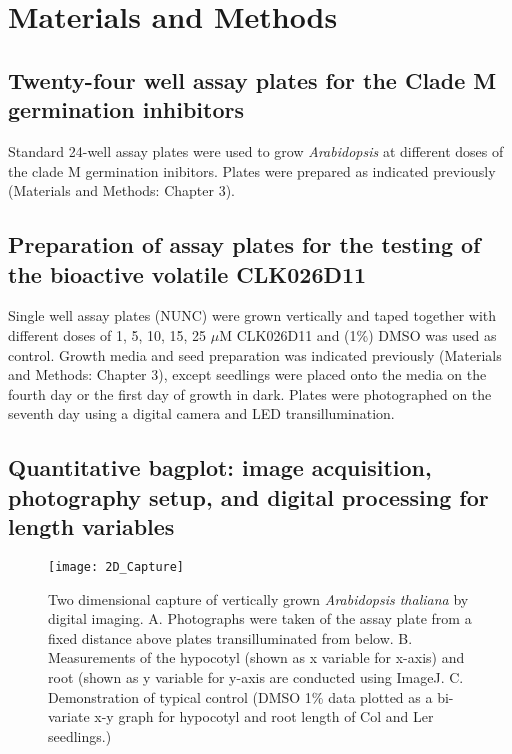 
\section{Materials and Methods}

\subsection{Twenty-four well assay plates for the Clade M germination inhibitors}

Standard 24-well assay plates were used to grow {\it Arabidopsis} at different doses of the clade M germination inibitors. Plates were prepared as indicated previously (Materials and Methods: Chapter 3).

\subsection{Preparation of assay plates for the testing of the bioactive volatile CLK026D11}

Single well assay plates (NUNC) were grown vertically and taped together with different doses of 1, 5, 10, 15, 25 $\mu$M CLK026D11 and (1{\%}) DMSO was used as control. Growth media and seed preparation was indicated previously (Materials and Methods: Chapter 3), except seedlings were placed onto the media on the fourth day or the first day of growth in dark. Plates were photographed on the seventh day using a digital camera and LED transillumination. 


\subsection{Quantitative bagplot: image acquisition, photography setup, and digital processing for length variables}

\begin{figure}
\centering
\texttt{[image: 2D\_Capture]}
\caption{Two dimensional capture of vertically grown {\it Arabidopsis thaliana} by digital imaging. A. Photographs were taken of the assay plate from a fixed distance above plates transilluminated from below. B. Measurements of the hypocotyl (shown as x variable for x-axis) and root (shown as y variable for y-axis are conducted using ImageJ. C. Demonstration of typical control (DMSO 1{\%} data plotted as a bi-variate x-y graph for hypocotyl and root length of Col and Ler seedlings.)}
\label{fig:2D_Capture}
\end{figure}

